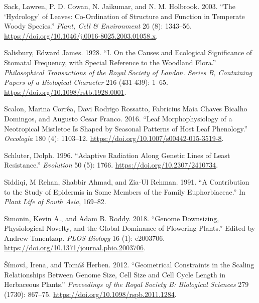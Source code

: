 \documentclass[
  12pt,
]{article}
\newlength{\cslhangindent}
\newlength{\cslentryspacingunit} %
\newenvironment{CSLReferences}[2] %
 {%
  \setlength{\parindent}{0pt}
  \ifodd #1
  \let\oldpar\par
  \def\par{\hangindent=\cslhangindent\oldpar}
  \fi
  \setlength{\parskip}{#2\cslentryspacingunit}
 }%
 {}
\begin{document}
\begin{CSLReferences}{1}{0}
\leavevmode{}%
Sack, Lawren, P. D. Cowan, N. Jaikumar, and N. M. Holbrook. 2003. {``The {`Hydrology'} of Leaves: Co-Ordination of Structure and Function in Temperate Woody Species.''} \emph{Plant, Cell \& Environment} 26 (8): 1343--56. \url{https://doi.org/10.1046/j.0016-8025.2003.01058.x}.

\leavevmode{}%
Salisbury, Edward James. 1928. {``I. {On} the Causes and Ecological Significance of Stomatal Frequency, with Special Reference to the Woodland Flora.''} \emph{Philosophical Transactions of the Royal Society of London. Series B, Containing Papers of a Biological Character} 216 (431-439): 1--65. \url{https://doi.org/10.1098/rstb.1928.0001}.

\leavevmode{}%
Scalon, Marina Corrêa, Davi Rodrigo Rossatto, Fabricius Maia Chaves Bicalho Domingos, and Augusto Cesar Franco. 2016. {``Leaf Morphophysiology of a {Neotropical} Mistletoe Is Shaped by Seasonal Patterns of Host Leaf Phenology.''} \emph{Oecologia} 180 (4): 1103--12. \url{https://doi.org/10.1007/s00442-015-3519-8}.

\leavevmode{}%
Schluter, Dolph. 1996. {``Adaptive {Radiation} {Along} {Genetic} {Lines} of {Least} {Resistance}.''} \emph{Evolution} 50 (5): 1766. \url{https://doi.org/10.2307/2410734}.

\leavevmode{}%
Siddiqi, M Rehan, Shabbir Ahmad, and Zia-Ul Rehman. 1991. {``A Contribution to the Study of Epidermis in Some Members of the Family {Euphorbiaceae}.''} In \emph{Plant {Life} of {South} {Asia}}, 169--82.

\leavevmode{}%
Simonin, Kevin A., and Adam B. Roddy. 2018. {``Genome Downsizing, Physiological Novelty, and the Global Dominance of Flowering Plants.''} Edited by Andrew Tanentzap. \emph{PLOS Biology} 16 (1): e2003706. \url{https://doi.org/10.1371/journal.pbio.2003706}.

\leavevmode{}%
Šímová, Irena, and Tomáš Herben. 2012. {``Geometrical Constraints in the Scaling Relationships Between Genome Size, Cell Size and Cell Cycle Length in Herbaceous Plants.''} \emph{Proceedings of the Royal Society B: Biological Sciences} 279 (1730): 867--75. \url{https://doi.org/10.1098/rspb.2011.1284}.


\end{CSLReferences}
\end{document}
